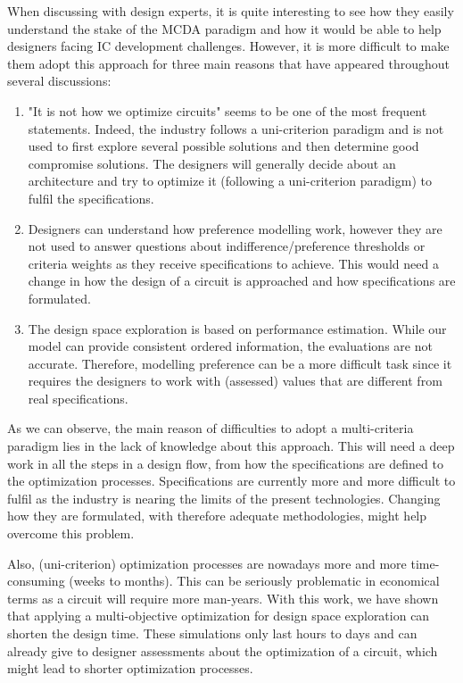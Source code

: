 When discussing with design experts, it is quite interesting to see how they easily understand the stake of the MCDA paradigm and how it would be able to help designers facing IC development challenges. However, it is more difficult to make them adopt this approach for three main reasons that have appeared throughout several discussions:

\begin{enumerate}
\item "It is not how we optimize circuits" seems to be one of the most frequent statements. Indeed, the industry follows a uni-criterion paradigm and is not used to first explore several possible solutions and then determine good compromise solutions. The designers will generally decide about an architecture and try to optimize it (following a uni-criterion paradigm) to fulfil the specifications.
\item Designers can understand how preference modelling work, however they are not used to answer questions about indifference/preference thresholds or criteria weights as they receive specifications to achieve. This would need a change in how the design of a circuit is approached and how specifications are formulated.
\item The design space exploration is based on performance estimation. While our model can provide consistent ordered information, the evaluations are not accurate. Therefore, modelling preference can be a more difficult task since it requires the designers to work with (assessed) values that are different from real specifications.
\end{enumerate}

As we can observe, the main reason of difficulties to adopt a multi-criteria paradigm lies in the lack of knowledge about this approach. This will need a deep work in all the steps in a design flow, from how the specifications are defined to the optimization processes. Specifications are currently more and more difficult to fulfil as the industry is nearing the limits of the present technologies. Changing how they are formulated, with therefore adequate methodologies, might help overcome this problem.

Also, (uni-criterion) optimization processes are nowadays more and more time-consuming (weeks to months). This can be seriously problematic in economical terms as a circuit will require more man-years. With this work, we have shown that applying a multi-objective optimization for design space exploration can shorten the design time. These simulations only last hours to days and can already give to designer assessments about the optimization of a circuit, which might lead to shorter optimization processes.


